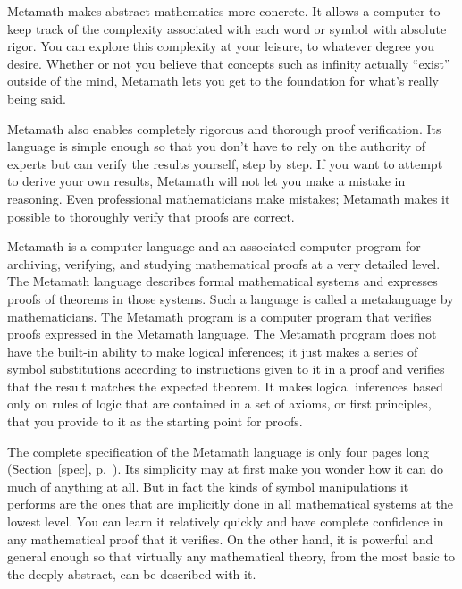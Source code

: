 Metamath makes abstract mathematics more concrete.  It allows
a computer to keep track of the complexity associated with each word or symbol
with absolute rigor.  You can explore this complexity at your leisure, to
whatever degree you desire.  Whether or not you believe that concepts such as
infinity actually ``exist'' outside of the mind, Metamath lets you get to the
foundation for what's really being said.

Metamath also enables completely rigorous and thorough proof verification.
Its language is simple enough so that you
don't have to rely on the authority of experts but can verify the results
yourself, step by step.  If you want to attempt to derive your own results,
Metamath will not let you make a mistake in reasoning.
Even professional mathematicians make mistakes; Metamath makes it possible
to thoroughly verify that proofs are correct.

Metamath is a computer language and an associated computer
program for archiving, verifying, and studying mathematical proofs at a very
detailed level.
The Metamath language
describes formal mathematical
systems and expresses proofs of theorems in those systems.  Such a language
is called a metalanguage by mathematicians.
The Metamath program is a computer program that verifies
proofs expressed in the Metamath language.
The Metamath program does not have the built-in
ability to make logical inferences; it just makes a series of symbol
substitutions according to instructions given to it in a proof
and verifies that the result matches the expected theorem.  It makes logical
inferences based only on rules of logic that are contained in a set of
axioms, or first principles, that you provide to it as the
starting point for proofs.

The complete specification of the Metamath language is only four pages long
(Section~\ref{spec}, p.~\pageref{spec}).  Its simplicity may at first make you
wonder how it can do much of anything at all.  But in fact the kinds of
symbol manipulations it performs are the ones that are implicitly done in all
mathematical systems at the lowest level.  You can learn it relatively quickly
and have complete confidence in any mathematical proof that it verifies.  On
the other hand, it is powerful and general enough so that virtually any
mathematical theory, from the most basic to the deeply abstract, can be
described with it.

